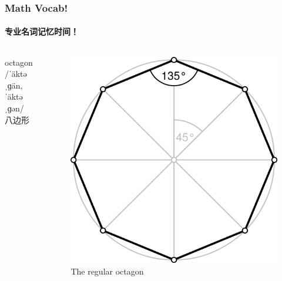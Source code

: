 \documentclass[
	11pt, %
]{beamer}
\begin{document}
\begin{frame}
	\frametitle{Math Vocab!} %
	\framesubtitle{专业名词记忆时间！}
	
	\begin{columns}[t] 
	\begin{column}{0.4\textwidth} %
		{\Huge octagon}\\
		{\LARGE /ˈäktəˌɡän,ˈäktəˌɡən/\\
			\bigskip\bigskip
		八边形}
	\end{column}
	\begin{column}{0.6\textwidth} %
		\begin{figure}
			\includegraphics[width=0.8\linewidth]{octagon.png}
			\caption{The regular octagon}
		\end{figure}	
	\end{column}
\end{columns}
\end{frame}

\end{document}
